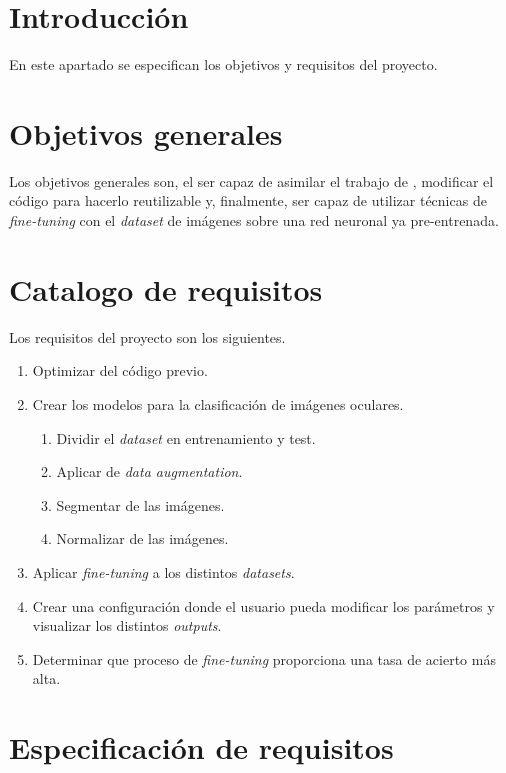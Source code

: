 
\section{Introducción}

En este apartado se especifican los objetivos y requisitos del proyecto.

\section{Objetivos generales}

Los objetivos generales son, el ser capaz de asimilar el trabajo de \cite{tfg_iris_2020}, modificar el código para hacerlo reutilizable y, finalmente, ser capaz de 
utilizar técnicas de \textit{fine-tuning} con el \textit{dataset} de imágenes sobre una red neuronal ya pre-entrenada.

\section{Catalogo de requisitos}

Los requisitos del proyecto son los siguientes.

\begin{enumerate}
    \item Optimizar del código previo.
    \item Crear los modelos para la clasificación de imágenes oculares.
        \begin{enumerate}
            \item Dividir el \textit{dataset} en entrenamiento y test.
            \item Aplicar de \textit{data augmentation}.
            \item Segmentar de las imágenes.
            \item Normalizar de las imágenes.
        \end{enumerate}
    \item Aplicar \textit{fine-tuning} a los distintos \textit{datasets}.
    \item Crear una configuración donde el usuario pueda modificar los parámetros y visualizar los distintos \textit{outputs}.
    \item Determinar que proceso de \textit{fine-tuning} proporciona una tasa de acierto más alta.
  \end{enumerate}

\section{Especificación de requisitos}

